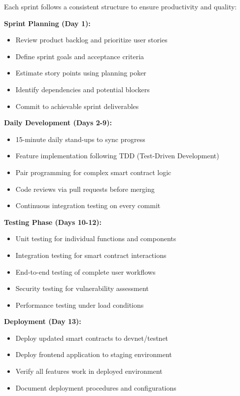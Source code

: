 \documentclass[a4paper,13pt,twoside]{report}
\theoremstyle{definition}
\begin{document}
Each sprint follows a consistent structure to ensure productivity and quality:

\textbf{Sprint Planning (Day 1):}
\begin{itemize}
    \item Review product backlog and prioritize user stories
    \item Define sprint goals and acceptance criteria
    \item Estimate story points using planning poker
    \item Identify dependencies and potential blockers
    \item Commit to achievable sprint deliverables
\end{itemize}

\textbf{Daily Development (Days 2-9):}
\begin{itemize}
    \item 15-minute daily stand-ups to sync progress
    \item Feature implementation following TDD (Test-Driven Development)
    \item Pair programming for complex smart contract logic
    \item Code reviews via pull requests before merging
    \item Continuous integration testing on every commit
\end{itemize}

\textbf{Testing Phase (Days 10-12):}
\begin{itemize}
    \item Unit testing for individual functions and components
    \item Integration testing for smart contract interactions
    \item End-to-end testing of complete user workflows
    \item Security testing for vulnerability assessment
    \item Performance testing under load conditions
\end{itemize}

\textbf{Deployment (Day 13):}
\begin{itemize}
    \item Deploy updated smart contracts to devnet/testnet
    \item Deploy frontend application to staging environment
    \item Verify all features work in deployed environment
    \item Document deployment procedures and configurations
\end{itemize}
\end{document}
